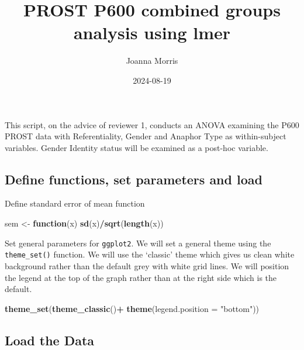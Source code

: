 \documentclass[
  10pt,
]{article}
\title{PROST P600 combined groups analysis using lmer}
\author{Joanna Morris}
\date{2024-08-19}
\newenvironment{Shaded}{\begin{snugshade}}{\end{snugshade}}
\newcommand{\AttributeTok}[1]{\textcolor[rgb]{0.13,0.29,0.53}{#1}}
\newcommand{\ControlFlowTok}[1]{\textcolor[rgb]{0.13,0.29,0.53}{\textbf{#1}}}
\newcommand{\FunctionTok}[1]{\textcolor[rgb]{0.13,0.29,0.53}{\textbf{#1}}}
\newcommand{\NormalTok}[1]{#1}
\newcommand{\OtherTok}[1]{\textcolor[rgb]{0.56,0.35,0.01}{#1}}
\newcommand{\SpecialCharTok}[1]{\textcolor[rgb]{0.81,0.36,0.00}{\textbf{#1}}}
\newcommand{\StringTok}[1]{\textcolor[rgb]{0.31,0.60,0.02}{#1}}
\begin{document}
\maketitle

\scriptsize

This script, on the advice of reviewer 1, conducts an ANOVA examining
the P600 PROST data with Referentiality, Gender and Anaphor Type as
within-subject variables. Gender Identity status will be examined as a
post-hoc variable.

\subsection{Define functions, set parameters and
load}\label{define-functions-set-parameters-and-load}

Define standard error of mean function

\begin{Shaded}
\begin{Highlighting}[]
\NormalTok{sem }\OtherTok{\textless{}{-}} \ControlFlowTok{function}\NormalTok{(x) }\FunctionTok{sd}\NormalTok{(x)}\SpecialCharTok{/}\FunctionTok{sqrt}\NormalTok{(}\FunctionTok{length}\NormalTok{(x))}
\end{Highlighting}
\end{Shaded}

Set general parameters for \texttt{ggplot2}. We will set a general theme
using the \texttt{theme\_set()} function. We will use the `classic'
theme which gives us clean white background rather than the default grey
with white grid lines. We will position the legend at the top of the
graph rather than at the right side which is the default.

\begin{Shaded}
\begin{Highlighting}[]
\FunctionTok{theme\_set}\NormalTok{(}\FunctionTok{theme\_classic}\NormalTok{()}\SpecialCharTok{+}
            \FunctionTok{theme}\NormalTok{(}\AttributeTok{legend.position =} \StringTok{"bottom"}\NormalTok{)) }
\end{Highlighting}
\end{Shaded}

\subsection{Load the Data}\label{load-the-data}
\end{document}

